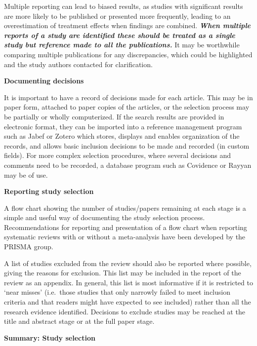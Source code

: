 \documentclass[
  11pt,
  a4paper,
  DIV=11,
  numbers=noendperiod]{scrreprt}
\begin{document}
Multiple reporting can lead to biased results, as studies with
significant results are more likely to be published or presented more
frequently, leading to an overestimation of treatment effects when
findings are combined. \textbf{\emph{When multiple reports of a study
are identified these should be treated as a single study but reference
made to all the publications.}} It may be worthwhile comparing multiple
publications for any discrepancies, which could be highlighted and the
study authors contacted for clarification.

\textbf{Documenting decisions}

It is important to have a record of decisions made for each article.
This may be in paper form, attached to paper copies of the articles, or
the selection process may be partially or wholly computerized. If the
search results are provided in electronic format, they can be imported
into a reference management program such as Jabef or Zotero which
stores, displays and enables organization of the records, and allows
basic inclusion decisions to be made and recorded (in custom fields).
For more complex selection procedures, where several decisions and
comments need to be recorded, a database program such as Covidence or
Rayyan may be of use.

\textbf{Reporting study selection}

A flow chart showing the number of studies/papers remaining at each
stage is a simple and useful way of documenting the study selection
process. Recommendations for reporting and presentation of a flow chart
when reporting systematic reviews with or without a meta-analysis have
been developed by the PRISMA group.

A list of studies excluded from the review should also be reported where
possible, giving the reasons for exclusion. This list may be included in
the report of the review as an appendix. In general, this list is most
informative if it is restricted to `near misses' (i.e.~those studies
that only narrowly failed to meet inclusion criteria and that readers
might have expected to see included) rather than all the research
evidence identified. Decisions to exclude studies may be reached at the
title and abstract stage or at the full paper stage.

\textbf{Summary: Study selection}
\end{document}
